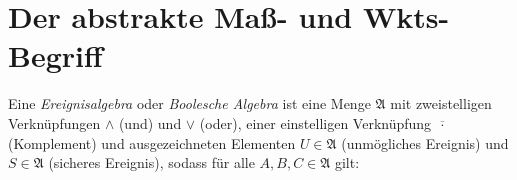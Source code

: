 \documentclass{cheat-sheet}
\newcommand{\Alg}{\mathfrak{A}} %
\begin{document}

\section{Der abstrakte Maß- und Wkts-Begriff}


\iffalse
\begin{defn}
  Ein \emph{zufälliger Versuch} ist ein Experiment,
  \begin{itemize}
    \item welches unter einem festen Bedingungskomplex beliebig oft wiederholbar ist und
    \item dessen Ausgänge wohldefiniert und bei jeder Wiederholung ungewiss sind.
  \end{itemize}
\end{defn}

\begin{defn}
  Ein zufälliges Ereignis ist ein Ergebnis eines zufälligen Experiments.
\end{defn}
\fi


\begin{defn}
  Eine \emph{Ereignisalgebra} oder \emph{Boolesche Algebra} ist eine Menge $\Alg$ mit zweistelligen Verknüpfungen $\wedge$ (\glqq und\grqq) und $\vee$ (\glqq oder\grqq), einer einstelligen Verknüpfung $\overline{\,\cdot\,}$ (Komplement) und ausgezeichneten Elementen $U \in \Alg$ (unmögliches Ereignis) und $S \in \Alg$ (sicheres Ereignis), sodass für alle $A, B, C \in \Alg$ gilt:

  {\scriptsize
  \begin{itemize}%
  \end{itemize}}
\end{defn}
\end{document}
